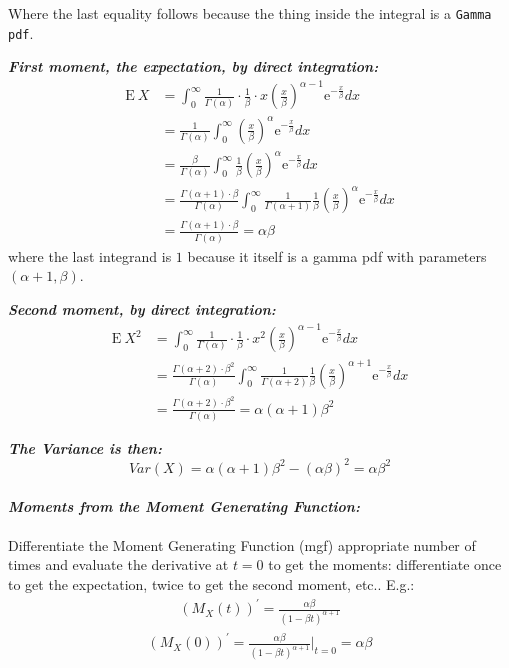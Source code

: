 \documentclass[12pt]{article}
\begin{document}
Where the last equality follows because the thing inside the integral is a \texttt{Gamma} \texttt{pdf}. 
 
 \textbf{\color{TealBlue}\emph{First moment, the expectation, by direct integration:} } 
\begin{align*}
 \mathrm{E} \: X &= \int_0^{\infty}  \frac{1}{\Gamma({\alpha})} \cdot \frac{1}{\beta} \cdot x  \left( \frac{x}{\beta}\right)^{\alpha - 1} \mathrm{e}^{-\frac{x}{\beta}} dx \\
&=   \frac{1}{\Gamma({\alpha})} \int_0^{\infty} \left( \frac{x}{\beta}\right)^{\alpha} \mathrm{e}^{-\frac{x}{\beta}} dx \\
&=   \frac{\beta}{\Gamma({\alpha})} \int_0^{\infty} \frac{1}{\beta} \left( \frac{x}{\beta}\right)^{\alpha} \mathrm{e}^{-\frac{x}{\beta}} dx \\
&=   \frac{ \Gamma({\alpha} + 1) \cdot \beta }{\Gamma({\alpha})} \int_0^{\infty} \frac{1}{\Gamma(\alpha + 1)} \frac{1}{\beta} \left( \frac{x}{\beta}\right)^{\alpha} \mathrm{e}^{-\frac{x}{\beta}} dx \\   
&=  \frac{ \Gamma({\alpha} + 1) \cdot \beta }{\Gamma({\alpha})}  = \alpha\beta
\end{align*}
where the last integrand is $1$ because it itself is a gamma pdf with parameters $(\alpha + 1, \beta)$. 


\bigskip

 \textbf{\color{TealBlue}\emph{Second moment, by direct integration:} } 
\begin{align*}
 \mathrm{E} \: X^2 &= \int_0^{\infty}  \frac{1}{\Gamma({\alpha})} \cdot \frac{1}{\beta} \cdot x^2  \left( \frac{x}{\beta}\right)^{\alpha - 1} \mathrm{e}^{-\frac{x}{\beta}} dx \\
&=   \frac{\Gamma(\alpha + 2) \cdot \beta^2}{\Gamma({\alpha})} \int_0^{\infty} \frac{1}{\Gamma(\alpha + 2)} \frac{1}{\beta} \left( \frac{x}{\beta}\right)^{\alpha +1 } \mathrm{e}^{-\frac{x}{\beta}} dx \\
&=  \frac{ \Gamma({\alpha} + 2) \cdot \beta^2 }{\Gamma({\alpha})}  = \alpha (\alpha + 1) \beta^2
\end{align*}

\textbf{\color{TealBlue}\emph{The Variance is then:} } 
$$
Var(X) = \alpha (\alpha + 1) \beta^2 - (\alpha \beta)^2 = \alpha \beta^2
$$\\

\textbf{\color{TealBlue}\emph{Moments from the Moment Generating Function:} } \\
\\
Differentiate the Moment Generating Function (mgf) appropriate number of times and evaluate the derivative at $t = 0$ to get the moments: differentiate once to get the expectation, twice to get the second moment, etc.. E.g.:
\begin{align*}
(M_X(t))^{'} = \frac{\alpha \beta} { (1 - \beta t)^{\alpha + 1}}  
\end{align*}
\begin{align*}
(M_X(0))^{'} =  \frac{\alpha \beta} { (1 - \beta t)^{\alpha + 1}}  \Big | _{t=0} = \alpha \beta
\end{align*}
\end{document}

